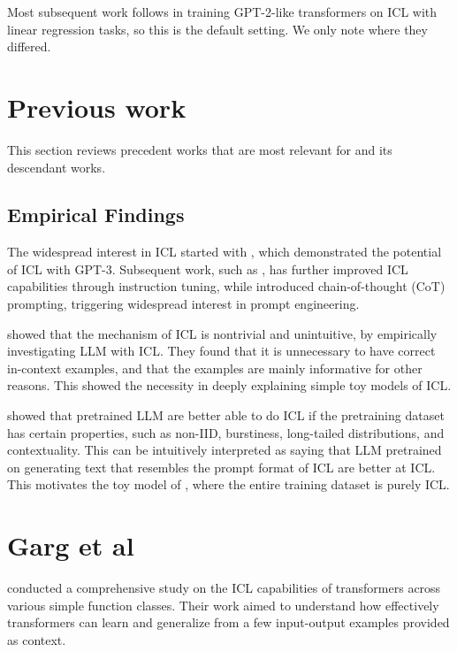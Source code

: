 \documentclass[12pt]{article}
\begin{document}
Most subsequent work follows \cite{gargWhatCanTransformers2022} in training GPT-2-like transformers on ICL with linear regression tasks, so this is the default setting. We only note where they differed.

\section{Previous work}

This section reviews precedent works that are most relevant for \cite{gargWhatCanTransformers2022} and its descendant works.

\subsection{Empirical Findings}

The widespread interest in ICL started with \cite{brownLanguageModelsAre2020}, which demonstrated the potential of ICL with GPT-3. Subsequent work, such as \cite{weiFinetunedLanguageModels2022}, has further improved ICL capabilities through instruction tuning, while \cite{kojimaLargeLanguageModels2022} introduced chain-of-thought (CoT) prompting, triggering widespread interest in prompt engineering.

\cite{minRethinkingRoleDemonstrations2022} showed that the mechanism of ICL is nontrivial and unintuitive, by empirically investigating LLM with ICL. They found that it is unnecessary to have correct in-context examples, and that the examples are mainly informative for other reasons. This showed the necessity in deeply explaining simple toy models of ICL.

\cite{chanDataDistributionalProperties2022} showed that pretrained LLM are better able to do ICL if the pretraining dataset has certain properties, such as non-IID, burstiness, long-tailed distributions, and contextuality. This can be intuitively interpreted as saying that LLM pretrained on generating text that resembles the prompt format of ICL are better at ICL. This motivates the toy model of \cite{gargWhatCanTransformers2022}, where the entire training dataset is purely ICL.

\section{Garg et al}

\cite{gargWhatCanTransformers2022} conducted a comprehensive study on the ICL capabilities of transformers across various simple function classes. Their work aimed to understand how effectively transformers can learn and generalize from a few input-output examples provided as context.
\end{document}
